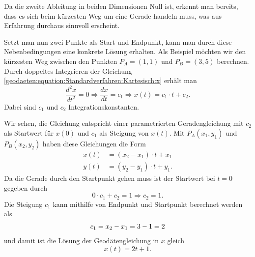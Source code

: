 Da die zweite Ableitung in beiden Dimensionen Null ist, erkennt man bereits, dass es sich beim kürzesten Weg um eine Gerade handeln muss, was aus Erfahrung durchaus sinnvoll erscheint.

Setzt man nun zwei Punkte als Start und Endpunkt, kann man durch diese Nebenbedingungen eine konkrete Lösung erhalten.
Als Beispiel möchten wir den kürzesten Weg zwischen den Punkten $P_A = (1,1)$ und $P_B = (3,5)$ berechnen. 
Durch doppeltes Integrieren der Gleichung \eqref{geodaeten:equation:Standardverfahren:Kartesisch:x} erhält man
\begin{equation}
	\frac{d^2x}{dt^2} = 0 
	\Rightarrow \frac{dx}{dt} = c_1 
	\Rightarrow x(t) = c_1 \cdot t + c_2  .
	\label{geodaeten:equation:Standardverfahren:Kartesisch:equation1}
\end{equation}
Dabei sind $c_1$  und $c_2$ Integrationskonstanten. 

Wir sehen, die Gleichung entspricht einer parametrierten Geradengleichung mit $c_2$ als Startwert für $x(0)$ und $c_1$ als Steigung von $x(t)$. 
Mit $P_A(x_1,y_1)$ und $P_B(x_2,y_2)$ haben diese Gleichungen die Form
\begin{align}
	x(t) &= (x_2 - x_1) \cdot t + x_1 \\
	y(t) &= (y_2 - y_1) \cdot t + y_1 .
\end{align}
Da die Gerade durch den Startpunkt gehen muss ist der Startwert bei $t=0$ gegeben durch
\begin{equation}
	0 \cdot c_1 + c_2 = 1 \Rightarrow c_2 = 1 .	
\end{equation}
Die Steigung $c_1$ kann mithilfe von Endpunkt und Startpunkt berechnet werden als
\begin{equation}
	c_1 = x_2 - x_1 \\ = 3-1 \\ = 2
\end{equation}
und damit ist die Lösung der Geodätengleichung in $x$ gleich
\begin{equation}
	x(t) = 2t + 1 .
	\label{geodaeten:equation:StaKartesisch:LoesungX}
\end{equation}

